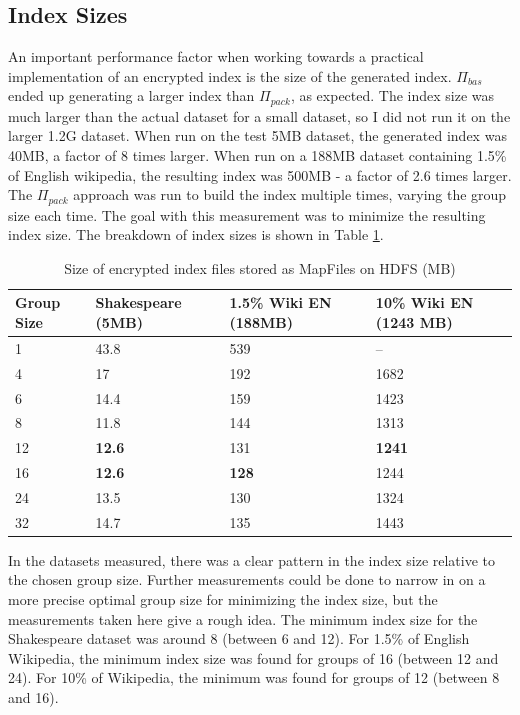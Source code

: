 \documentclass{sig-alternate-05-2015}
\begin{document}
\subsection{Index Sizes}
An important performance factor when working towards a practical implementation of an encrypted index is the size of the generated index. $\Pi_{bas}$ ended up generating a larger index than $\Pi_{pack}$, as expected. The index size was much larger than the actual dataset for a small dataset, so I did not run it on the larger 1.2G dataset. When run on the test 5MB dataset, the generated index was 40MB, a factor of 8 times larger. When run on a 188MB dataset containing 1.5\% of English wikipedia, the resulting index was 500MB - a factor of 2.6 times larger.
The $\Pi_{pack}$ approach was run to build the index multiple times, varying the group size each time. The goal with this measurement was to minimize the resulting index size. The breakdown of index sizes is shown in Table \ref{index-sizes}.

\begin{table}
\centering
\caption{Size of encrypted index files stored as MapFiles on HDFS (MB)}
\label{index-sizes}
\begin{tabular}{|l|l|l|l|} \hline
Group Size & Shakespeare (5MB) & 1.5\% Wiki EN (188MB) & 10\% Wiki EN (1243 MB) \\ \hline
1          & 43.8               & 539                   & --                      \\ \hline
4          & 17                  & 192                    & 1682                \\ \hline
6          & 14.4               & 159                   & 1423                 \\ \hline
8          & 11.8               & 144                   & 1313                 \\ \hline
12         & \textbf{12.6}  & 131                  & \textbf{1241}      \\ \hline
16         & \textbf{12.6}  & \textbf{128}      & 1244                  \\ \hline
24         & 13.5              & 130                  & 1324                  \\ \hline
32         & 14.7              & 135                  & 1443                  \\ \hline
\end{tabular}
\end{table}

In the datasets measured, there was a clear pattern in the index size relative to the chosen group size. Further measurements could be done to narrow in on a more precise optimal group size for minimizing the index size, but the measurements taken here give a rough idea. The minimum index size for the Shakespeare dataset was around 8 (between 6 and 12). For 1.5\% of English Wikipedia, the minimum index size was found for groups of 16 (between 12 and 24). For 10\% of Wikipedia, the minimum was found for groups of 12 (between 8 and 16).
\end{document}
